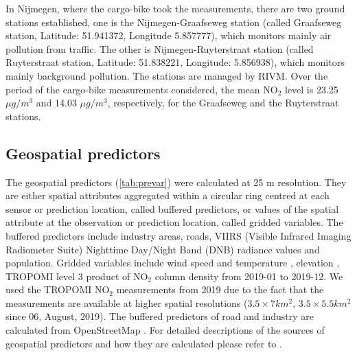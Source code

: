 \documentclass{article}
\begin{document}
In Nijmegen, where the cargo-bike took the measurements, there are two ground stations established, one is the Nijmegen-Graafseweg station (called Graafseweg station, Latitude: 51.941372, Longitude 5.857777), which monitors mainly air pollution from traffic. The other is Nijmegen-Ruyterstraat station (called Ruyterstraat station, Latitude: 51.838221, Longitude: 5.856938), which monitors mainly background pollution. The stations are managed by RIVM. Over the period of the cargo-bike measurements considered, the mean NO$_2$ level is 23.25 $\mu g/m^3$ and 14.03 $\mu g/m^3$, respectively, for the Graafseweg and the Ruyterstraat stations.  

\subsection{Geospatial predictors}
 The geospatial predictors (\cref{tab:prevar}) were calculated at 25 m resolution. They are either spatial attributes aggregated within a circular ring centred at each sensor or prediction location, called buffered predictors, or values of the spatial attribute at the observation or prediction location, called gridded variables. The buffered predictors include industry areas, roads, VIIRS (Visible Infrared Imaging Radiometer Suite) Nighttime Day/Night Band (DNB) radiance values \citep[nightlight,][]{nightlight} and population. Gridded variables include wind speed and temperature \citep{dee2011era}, elevation \citep{amante2009etopo1}, TROPOMI level 3 product of NO$_2$ column density from 2019-01 to 2019-12. 
We used the TROPOMI NO$_2$ measurements from 2019 due to the fact that the measurements are available at higher spatial resolutions ($3.5 \times 7 km^2$, $3.5 \times 5.5 km^2$ since 06, August, 2019). The buffered predictors of road and industry are calculated from OpenStreetMap  \citep{openstreetmap}. For detailed descriptions of the sources of geospatial predictors and how they are calculated please refer to \cite{luglobal}.   
  
\end{document}
